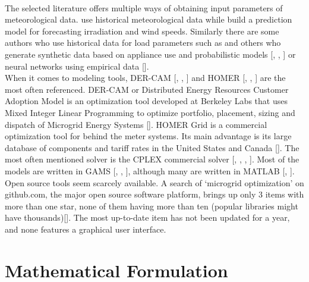 \documentclass[
	11pt,								%
	DIV10,								%
	a4paper,         					%
	oneside,							%
	headheight=20pt,					%
	footheight=20pt,					%
    parskip=full,						%
    listof=totoc,						%
	bibliography=totoc,					%
	index=totoc,						%
]{scrartcl}
\begin{document}
\\
The selected literature offers multiple ways of obtaining input parameters of meteorological data. \cite{7981571} use historical meteorological data while \cite{palma2013microgrid} build a prediction model for forecasting irradiation and wind speeds. Similarly there are some authors who use historical data for load parameters such as \cite{7981571} and others who generate synthetic data based on appliance use and probabilistic models [\cite{zhang2013efficient}, \cite{zhang2011optimal}, \cite{zhang2015optimal}] or neural networks using empirical data [\cite{palma2013microgrid}].
\\
When it comes to modeling tools, DER-CAM [\cite{LAUINGER201624}, \cite{ZHENG2018204}, \cite{8023785}] and HOMER [\cite{amrollahi2017techno}, \cite{ZHENG2018204}, \cite{LAUINGER201624}] are the most often referenced. DER-CAM or Distributed Energy Resources Customer Adoption Model is an optimization tool developed at Berkeley Labs that uses Mixed Integer Linear Programming to optimize portfolio, placement, sizing and dispatch of Microgrid Energy Systems [\cite{DistributedEnergyResources2018}]. HOMER Grid is a commercial optimization tool for behind the meter systems. Its main advantage is its large database of components and tariff rates in the United States and Canada [\cite{HOMERGridBehindtheMeter2018}]. The most often mentioned solver is the CPLEX commercial solver [\cite{sechilariu2014supervision}, \cite{NEMATI2018944}, \cite{UMEOZOR2016672}, \cite{7741704}]. Most of the models are written in GAMS [\cite{silvente2015rolling}, \cite{UMEOZOR2016672}, \cite{CRAPARO2017135}], although many are written in MATLAB [\cite{7741704}, \cite{7972908}].
\\
Open source tools seem scarcely available. A search of `microgrid optimization' on github.com, the major open source software platform, brings up only 3 items with more than one star, none of them having more than ten (popular libraries might have thousands)[\cite{GithubSearchMicrogrid2018}]. The most up-to-date item has not been updated for a year, and none features a graphical user interface.

\newpage
{}	
\section{Mathematical Formulation}
\end{document}
